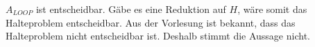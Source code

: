 $A_{LOOP}$ ist entscheidbar. Gäbe es eine Reduktion auf $H$, wäre somit das Halteproblem entscheidbar. Aus der Vorlesung ist bekannt, dass das Halteproblem nicht entscheidbar ist. Deshalb stimmt die Aussage nicht.